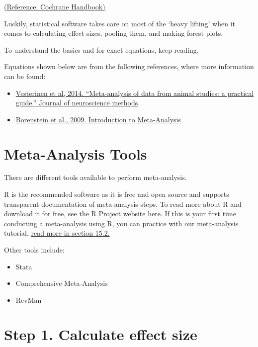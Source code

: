 \documentclass[
]{book}
\providecommand{\tightlist}{%
  \setlength{\itemsep}{0pt}\setlength{\parskip}{0pt}}
\begin{document}
\href{https://training.cochrane.org/handbook/current}{(Reference: Cochrane Handbook)}

Luckily, statistical software takes care on most of the `heavy lifting' when it comes to calculating effect sizes, pooling them, and making forest plots.

To understand the basics and for exact equations, keep reading.

Equations shown below are from the following references, where more information can be found:

\begin{itemize}
\item
  \href{https://doi.org/10.1016/j.jneumeth.2013.09.010}{Vesterinen et al, 2014. ``Meta-analysis of data from animal studies: a practical guide.'' Journal of neuroscience methods}
\item
  \href{https://doi.org/10.1002/9780470743386}{Borenstein et al., 2009. Introduction to Meta-Analysis}
\end{itemize}

\hypertarget{meta-analysis-tools}{%
\section{Meta-Analysis Tools}\label{meta-analysis-tools}}

There are different tools available to perform meta-analysis.

R is the recommended software as it is free and open source and supports transparent documentation of meta-analysis steps. To read more about R and download it for free, \href{https://www.r-project.org/}{see the R Project website here.}
If this is your first time conducting a meta-analysis using R, you can practice with our meta-analysis tutorial, \href{www.camarades.de/workshops.html\#meta-analysis-tutorial}{read more in section 15.2.}

Other tools include:

\begin{itemize}
\tightlist
\item
  Stata
\item
  Comprehensive Meta-Analysis
\item
  RevMan
\end{itemize}

\hypertarget{step-1.-calculate-effect-size}{%
\section{Step 1. Calculate effect size}\label{step-1.-calculate-effect-size}}
\end{document}

